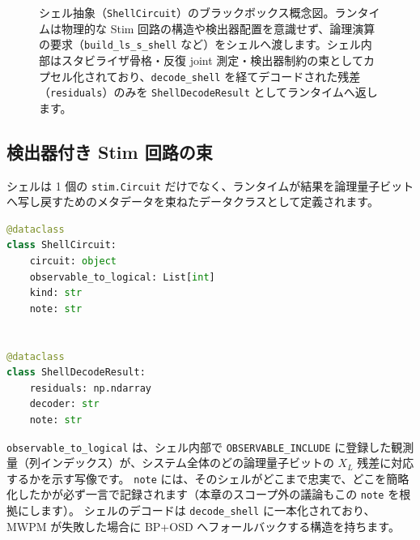\begin{figure}[htbp]
  \caption{シェル抽象（\texttt{ShellCircuit}）のブラックボックス概念図。ランタイムは物理的な Stim 回路の構造や検出器配置を意識せず、論理演算の要求（\texttt{build\_ls\_s\_shell} など）をシェルへ渡します。シェル内部はスタビライザ骨格・反復 joint 測定・検出器制約の束としてカプセル化されており、\texttt{decode\_shell} を経てデコードされた残差（\texttt{residuals}）のみを \texttt{ShellDecodeResult} としてランタイムへ返します。}
  \label{fig:ch11_shell_blackbox}
\end{figure}

\subsection{検出器付き Stim 回路の束}\label{subsec:shell_bundle}

シェルは 1 個の \texttt{stim.Circuit} だけでなく、ランタイムが結果を論理量子ビットへ写し戻すためのメタデータを束ねたデータクラスとして定義されます。

\begin{lstlisting}[language=Python, caption={ShellCircuit / ShellDecodeResult（src/stages/01\_mpp/src/ftqc/ls\_handoff\_shells.py）}]
@dataclass
class ShellCircuit:
    circuit: object
    observable_to_logical: List[int]
    kind: str
    note: str


@dataclass
class ShellDecodeResult:
    residuals: np.ndarray
    decoder: str
    note: str
\end{lstlisting}

\texttt{observable\_to\_logical} は、シェル内部で \texttt{OBSERVABLE\_INCLUDE} に登録した観測量（列インデックス）が、システム全体のどの論理量子ビットの $X_L$ 残差に対応するかを示す写像です。
\texttt{note} には、そのシェルがどこまで忠実で、どこを簡略化したかが必ず一言で記録されます（本章のスコープ外の議論もこの \texttt{note} を根拠にします）。
シェルのデコードは \texttt{decode\_shell} に一本化されており、MWPM が失敗した場合に BP+OSD へフォールバックする構造を持ちます。

